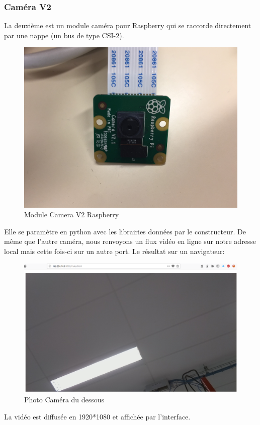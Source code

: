 \documentclass[a4paper,11pt]{report}
\begin{document}
				\subsubsection{Caméra V2}
					La deuxième est un module caméra pour Raspberry \cite{ref2} qui se raccorde directement par une nappe (un bus de type CSI-2). 
					\begin{figure}[!h]
					\begin{center}
						\includegraphics[scale=0.1]{Photos/Camera21.jpg}
						\caption{Module Camera V2 Raspberry}
					\end{center}
				\end{figure}
				\newline Elle se paramètre en python avec les librairies données par le constructeur. De même que l'autre caméra, nous renvoyons un flux vidéo en ligne sur notre adresse local \cite{ref3} mais cette fois-ci sur un autre port.
				\newline
				\newline Le résultat sur un navigateur:
					\begin{figure}[!h]
					\begin{center}
						\includegraphics[scale=0.3]{Photos/Camera2.png}
						\caption{Photo Caméra du dessous}
					\end{center}
				\end{figure}
				\newline La vidéo est diffusée en 1920*1080 et affichée par l'interface.
				
\end{document}
